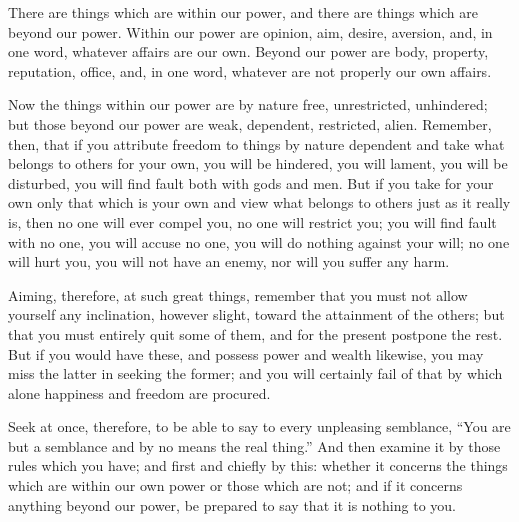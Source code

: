 There are  things which are  within our power, and  there are things  which are
beyond our power. Within our power  are opinion, aim, desire, aversion, and, in
one word,  whatever affairs are our  own. Beyond our power  are body, property,
reputation,  office, and,  in  one  word, whatever  are  not  properly our  own
affairs.

Now the things  within our power are by nature  free, unrestricted, unhindered;
but those  beyond our power  are weak, dependent, restricted,  alien. Remember,
then, that if you attribute freedom to things by nature dependent and take what
belongs to others for your own, you will be hindered, you will lament, you will
be disturbed, you will  find fault both with gods and men. But  if you take for
your own only that which is your own and view what belongs to others just as it
really is, then no one will ever compel you, no one will restrict you; you will
find fault  with no one, you  will accuse no  one, you will do  nothing against
your will;  no one  will hurt you,  you will  not have an  enemy, nor  will you
suffer any harm.

Aiming,  therefore, at  such great  things, remember  that you  must not  allow
yourself any inclination, however slight,  toward the attainment of the others;
but that you must entirely quit some  of them, and for the present postpone the
rest. But if you  would have these, and possess power  and wealth likewise, you
may miss the latter in seeking the  former; and you will certainly fail of that
by which alone happiness and freedom are procured.

Seek at once, therefore, to be able to say to every unpleasing semblance, ``You
are but a  semblance and by no means  the real thing.'' And then  examine it by
those rules which you have; and first  and chiefly by this: whether it concerns
the things  which are within our  own power or those  which are not; and  if it
concerns anything beyond  our power, be prepared  to say that it  is nothing to
you.
